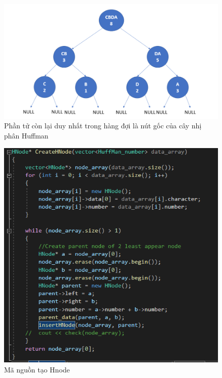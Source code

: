 \documentclass[14pt]{extreport}
\begin{document}
\begin{center}
    \begin{figure}[H]
    \begin{center}
     \includegraphics[scale=0.65]{createNode_3.PNG}
    \end{center}
    \caption{Phần tử còn lại duy nhất trong hàng đợi là nút gốc của cây nhị phân Huffman}
    \label{refhinh1}
    \end{figure}
\end{center}

\begin{center}
    \begin{figure}[H]
    \begin{center}
     \includegraphics[scale=1.35]{createNode_source.PNG}
    \end{center}
    \caption{Mã nguồn tạo Hnode}
    \label{refhinh1}
    \end{figure}
\end{center}
\end{document}
